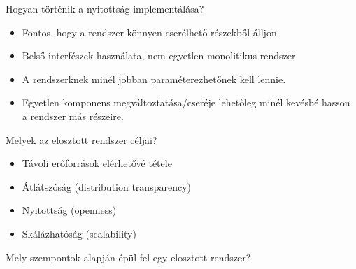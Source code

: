 \documentclass[twoside, a4paper, 12pt]{article}
\begin{document}
\begin{description}
                                                                        \color{clrNonExam}
                                                                    \item Hogyan történik a nyitottság implementálása?
                                                                        \begin{itemize}
                                                                            \item Fontos, hogy a rendszer könnyen cserélhető részekből álljon
                                                                            \item Belső interfészek használata, nem egyetlen monolitikus rendszer
                                                                            \item A rendszerknek minél jobban paraméterezhetőnek kell lennie.
                                                                            \item Egyetlen komponens megváltoztatása/cseréje lehetőleg minél
                                                                                kevésbé hasson a rendszer más részeire.
                                                                        \end{itemize}
                                                                    \item Melyek az elosztott rendszer céljai?
                                                                        \begin{itemize}
                                                                            \item Távoli erőforrások elérhetővé tétele
                                                                            \item Átlátszóság (distribution transparency)
                                                                            \item Nyitottság (openness)
                                                                            \item Skálázhatóság (scalability)
                                                                        \end{itemize}
                                                                    \item  Mely szempontok alapján épül fel egy elosztott rendszer?
                                                                        \begin{itemize}

\end{itemize}
\end{description}
\end{document}
